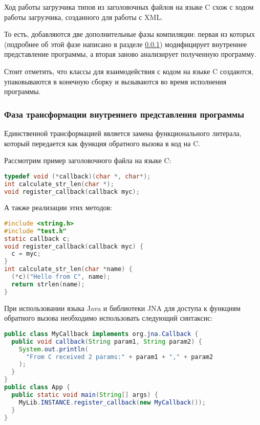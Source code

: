 Ход работы загрузчика типов из заголовочных файлов на языке C схож с ходом работы загрузчика, созданного для работы с XML.

То есть, добавляются две дополнительные фазы компиляции: первая из которых (подробнее об этой фазе написано в разделе \ref{c-tranformation-phase}) модифицирует внутреннее представление программы, а вторая заново анализирует полученную программу.

Стоит отметить, что классы для взаимодействия с кодом на языке C создаются, упаковываются в конечную сборку и вызываются во время исполнения программы.

\subsubsection{Фаза трансформации внутреннего представления программы}\label{c-tranformation-phase}
Единственной трансформацией является замена функционального литерала, который передается как функция обратного вызова в код на C.

Рассмотрим пример заголовочного файла на языке C:

\begin{code}\begin{lstlisting}[language=C, caption={Пример заголовочного файла на языке C с декларацией функции обратного вызова.}, label=callback-c-example]
typedef void (*callback)(char *, char*);
int calculate_str_len(char *);
void register_callback(callback myc);
\end{lstlisting}\end{code}

\begin{code}
А также реализации этих методов:
\begin{lstlisting}[language=C, caption={Реализация функции обратного вызова из примера~\ref{callback-c-example}.}, label=callback-c-example-impl]
#include <string.h>
#include "test.h"
static callback c;
void register_callback(callback myc) {
  c = myc;
}
int calculate_str_len(char *name) {
  (*c)("Hello from C", name);
  return strlen(name);
}
\end{lstlisting}\end{code}

При использовании языка Java и библиотеки JNA для доступа к функциям обратного вызова необходимо использовать следующий синтаксис:
\begin{code}\begin{lstlisting}[language=Java, caption={Пример передачи функции обратного вызова в языке Java с использованием библиотеки JNA.}, label=java-callback-example]
public class MyCallback implements org.jna.Callback {
  public void callback(String param1, String param2) {
    System.out.println(
      "From C received 2 params:" + param1 + "," + param2
    );
  }
}
public class App {
  public static void main(String[] args) {
    MyLib.INSTANCE.register_callback(new MyCallback());
  }
}
\end{lstlisting}\end{code}

